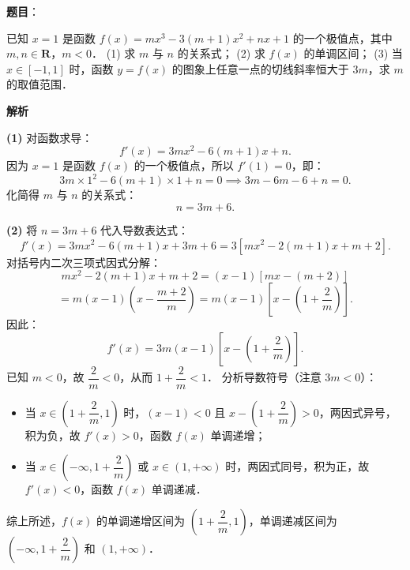 \begin{answer}

\textbf{题目}：

已知 $x = 1$ 是函数 $f(x) = mx^3 - 3(m+1)x^2 + nx + 1$ 的一个极值点，其中 $m, n \in \mathbf{R}$，$m < 0$．
(1) 求 $m$ 与 $n$ 的关系式；
(2) 求 $f(x)$ 的单调区间；
(3) 当 $x \in [-1, 1]$ 时，函数 $y = f(x)$ 的图象上任意一点的切线斜率恒大于 $3m$，求 $m$ 的取值范围．

\textbf{解析}

\textbf{(1)}
对函数求导：
\nopagebreak[4]
\[
f'(x) = 3mx^2 - 6(m+1)x + n.
\]
因为 $x = 1$ 是函数 $f(x)$ 的一个极值点，所以 $f'(1) = 0$，即：
\nopagebreak[4]
\[
3m \times 1^2 - 6(m+1) \times 1 + n = 0 \implies 3m - 6m - 6 + n = 0.
\]
化简得 $m$ 与 $n$ 的关系式：
\nopagebreak[4]
\[
n = 3m + 6.
\]

\textbf{(2)}
将 $n = 3m + 6$ 代入导数表达式：
\nopagebreak[4]
\[
f'(x) = 3mx^2 - 6(m+1)x + 3m + 6 = 3[mx^2 - 2(m+1)x + m + 2].
\]
对括号内二次三项式因式分解：
\nopagebreak[4]
\[
mx^2 - 2(m+1)x + m + 2 = (x - 1)[mx - (m+2)]
\]
\nopagebreak[4]
\[
= m(x - 1)\left(x - \dfrac{m+2}{m}\right) = m(x - 1)\left[x - \left(1 + \dfrac{2}{m}\right)\right].
\]
因此：
\nopagebreak[4]
\[
f'(x) = 3m(x - 1)\left[x - \left(1 + \dfrac{2}{m}\right)\right].
\]
已知 $m < 0$，故 $\dfrac{2}{m} < 0$，从而 $1 + \dfrac{2}{m} < 1$．
分析导数符号（注意 $3m < 0$）：
\begin{itemize}
\item 当 $x \in \left(1 + \dfrac{2}{m}, 1\right)$ 时，$(x - 1) < 0$ 且 $x - \left(1 + \dfrac{2}{m}\right) > 0$，两因式异号，积为负，故 $f'(x) > 0$，函数 $f(x)$ 单调递增；
\item 当 $x \in \left(-\infty, 1 + \dfrac{2}{m}\right)$ 或 $x \in (1, +\infty)$ 时，两因式同号，积为正，故 $f'(x) < 0$，函数 $f(x)$ 单调递减．
\end{itemize}
综上所述，$f(x)$ 的单调递增区间为 $\left(1 + \dfrac{2}{m}, 1\right)$，单调递减区间为 $\left(-\infty, 1 + \dfrac{2}{m}\right)$ 和 $(1, +\infty)$．


\end{answer}

